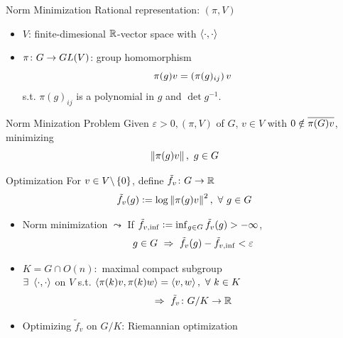 \documentclass{beamer}
\begin{document}
	\begin{frame}{Norm Minimization}
		Rational representation: $(\pi,V)$
		\begin{itemize}
			\item $V$: finite-dimesional $\mathbb{R}$-vector space with $\left\langle \cdot,\cdot \right\rangle$
			\item $\pi \colon G \rightarrow GL(V)$: group homomorphism 
			\vspace{-0.5em}
			\begin{equation*}
				\pi(g)v = \bc{\pi(g)_{ij}}v
 				\vspace{-0.5em}
			\end{equation*}
			s.t. $\pi(g)_{ij}$ is a polynomial in $g$ and $\det g^{-1}$.
		\end{itemize}

		\begin{block}{Norm Minization Problem}
			Given $\varepsilon > 0,(\pi,V)$ of $G$, $v \in V$ with $0 \notin \overline{\pi(G)v}$, minimizing
			\vspace{-0.5em}
			\begin{equation*}
				\left\lVert\pi(g)v\right\lVert,~g \in G
			\end{equation*}
		\end{block}
	\end{frame}

	\begin{frame}{Optimization}
		For $v \in V\backslash \left\{0\right\}$, define $\tilde{f}_v \colon G \rightarrow \mathbb{R}$
		\begin{equation*}
			\tilde{f}_v(g) \vcentcolon= \log \left\lVert\pi(g)v\right\lVert^2,~\forall~g\in G
		\end{equation*}
		\vspace{-1em}
		\begin{itemize}
			\item Norm minimization $\leadsto$ If $\tilde{f}_{v,\inf} \vcentcolon= \inf_{g \in G}\tilde{f}_v(g) > -\infty$,
			\vspace{-0.5em}
			\begin{equation*}
			 	g \in G ~\Rightarrow~ \tilde{f}_v(g)-\tilde{f}_{v,\inf} < \varepsilon
			 	\vspace{-0.5em}
			\end{equation*}
			\item $K = G \cap O(n) \colon$ maximal compact subgroup \\\vspace{0.5em}
			$\exists~\left\langle \cdot,\cdot \right\rangle$ on $V$ s.t. $\left\langle \pi(k)v,\pi(k)w \right\rangle = \left\langle v,w \right\rangle,~\forall~k \in K$
			\begin{equation*}
				\Rightarrow~\tilde{f}_v \colon G/K \rightarrow \mathbb{R}
			\end{equation*}
			\item Optimizing $\tilde{f}_v$ on $G/K$: Riemannian optimization
		\end{itemize}
	\end{frame}
\end{document}
